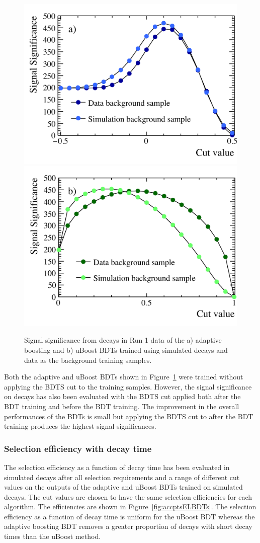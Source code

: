 \begin{figure}[tbp]
    \centering
        \includegraphics[width=0.49 \textwidth]{./Figs/Selection/BDT_data_MC_comp.pdf}
       \includegraphics[width=0.49 \textwidth]{./Figs/Selection/uBoost_data_MC_comp.pdf}
    \caption{Signal significance from \bhh decays in Run 1 data of the a) adaptive boosting and b) uBoost BDTs trained using simulated decays and data as the background training samples.}
    \label{fig:SSelBDTs}
\end{figure}

Both the adaptive and uBoost BDTs shown in Figure~\ref{fig:SSelBDTs} were trained without applying the BDTS cut to the training samples. However, the signal significance on \bhh decays has also been evaluated with the BDTS cut applied both after the BDT training and before the BDT training. The improvement in the overall performances of the BDTs is small but applying the BDTS cut to \bhh after the BDT training produces the highest signal significances. 

\subsubsection{Selection efficiency with decay time}
\label{sec:seleff}
The selection efficiency as a function of decay time has been evaluated in simulated \bsmumu decays after all selection requirements and a range of different cut values on the outputs of the adaptive and uBoost BDTs trained on simulated decays. The cut values are chosen to have the same selection efficiencies for each algorithm. The efficiencies are shown in Figure~\ref{fig:accptsELBDTs}. The selection efficiency as a function of decay time is uniform for the uBoost BDT whereas the adaptive boosting BDT removes a greater proportion of decays with short decay times than the uBoost method. 

